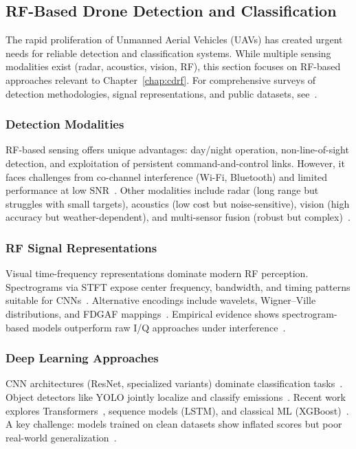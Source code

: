 \subsection{RF-Based Drone Detection and Classification}
\label{sec:drone_detection_background}

The rapid proliferation of Unmanned Aerial Vehicles (UAVs) has created urgent needs for reliable detection and classification systems. While multiple sensing modalities exist (radar, acoustics, vision, RF), this section focuses on RF-based approaches relevant to Chapter~\ref{chap:cdrf}. For comprehensive surveys of detection methodologies, signal representations, and public datasets, see~\cite{allahham2020deep, basak2021combined}.

\subsubsection{Detection Modalities}

RF-based sensing offers unique advantages: day/night operation, non-line-of-sight detection, and exploitation of persistent command-and-control links. However, it faces challenges from co-channel interference (Wi-Fi, Bluetooth) and limited performance at low SNR~\cite{nguyen2025effective, rfuav}. Other modalities include radar (long range but struggles with small targets), acoustics (low cost but noise-sensitive), vision (high accuracy but weather-dependent), and multi-sensor fusion (robust but complex)~\cite{akter2022explainable, mrabet2024machine}.

\subsubsection{RF Signal Representations}

Visual time-frequency representations dominate modern RF perception. Spectrograms via STFT expose center frequency, bandwidth, and timing patterns suitable for CNNs~\cite{rfuav}. Alternative encodings include wavelets, Wigner–Ville distributions, and FDGAF mappings~\cite{bai2020intelligent}. Empirical evidence shows spectrogram-based models outperform raw I/Q approaches under interference~\cite{fu2024radio, medaiyese2022wavelet}.

\subsubsection{Deep Learning Approaches}

CNN architectures (ResNet, specialized variants) dominate classification tasks~\cite{KILIC2022101028, he2016deep}. Object detectors like YOLO jointly localize and classify emissions~\cite{rfuav}. Recent work explores Transformers~\cite{vaswani2017attention}, sequence models (LSTM), and classical ML (XGBoost)~\cite{drone2024daiarticle}. A key challenge: models trained on clean datasets show inflated scores but poor real-world generalization~\cite{elyousseph2024robustness}.

